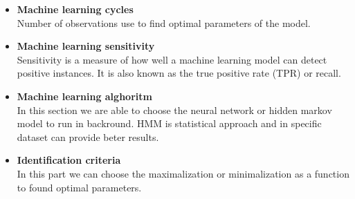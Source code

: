         \begin{itemize}
            \item \textbf{Machine learning cycles}\\
            Number of observations use to find optimal parameters of the model.
            \item \textbf{Machine learning sensitivity}\\
            Sensitivity is a measure of how well a machine learning model can
            detect positive instances. It is also known as the true positive rate
            (TPR) or recall.
            \item \textbf{Machine learning alghoritm}\\
            In this section we are able to choose the neural network or hidden markov model
            to run in backround. HMM is statistical approach and in specific dataset can provide
            beter results.
            \item \textbf{Identification criteria}\\
            In this part we can choose the maximalization or minimalization as a function
            to found optimal parameters.
        \end{itemize}
